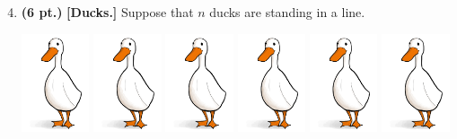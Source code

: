 \documentclass[11pt]{article}
\newcommand{\pts}[1]{\textbf{(#1 pt.)}}
\begin{document}
\begin{enumerate}
\setcounter{enumi}{3}
\item \pts{6} \textbf{[Ducks.]}
Suppose that $n$ ducks are standing in a line.  
\begin{center}
\includegraphics[width=2cm]{duck}
\hspace{.1cm}
\includegraphics[width=2cm]{duck}
\hspace{.1cm}
\includegraphics[width=2cm]{duck}
\hspace{.1cm}
\includegraphics[width=2cm]{duck}
\hspace{.1cm}
\includegraphics[width=2cm]{duck}
\hspace{.1cm}
\includegraphics[width=2cm]{duck}
\end{center}


\end{enumerate}
\end{document}
